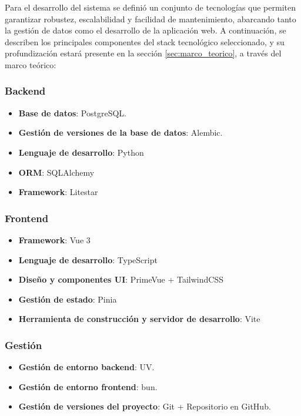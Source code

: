 Para el desarrollo del sistema se definió un conjunto de tecnologías que permiten garantizar 
robustez, escalabilidad y facilidad de mantenimiento, abarcando tanto la gestión de datos 
como el desarrollo de la aplicación web. A continuación, se describen los principales 
componentes del stack tecnológico seleccionado, y su profundización estará presente en la 
sección \ref{sec:marco_teorico}, a través del marco teórico:

\subsubsection*{Backend}

\begin{itemize}
	\item \textbf{Base de datos}: PostgreSQL.
	\item \textbf{Gestión de versiones de la base de datos}: Alembic.
	\item \textbf{Lenguaje de desarrollo}: Python
	\item \textbf{ORM}: SQLAlchemy
	\item \textbf{Framework}: Litestar
\end{itemize}

\subsubsection*{Frontend}

\begin{itemize}
	\item \textbf{Framework}: Vue 3
	\item \textbf{Lenguaje de desarrollo}: TypeScript
	\item \textbf{Diseño y componentes UI}: PrimeVue + TailwindCSS
	\item \textbf{Gestión de estado}: Pinia
	\item \textbf{Herramienta de construcción y servidor de desarrollo}: Vite
\end{itemize}

\subsubsection*{Gestión}

\begin{itemize}
	\item \textbf{Gestión de entorno backend}: UV.
	\item \textbf{Gestión de entorno frontend}: bun.
	\item \textbf{Gestión de versiones del proyecto}: Git + Repositorio en GitHub.
\end{itemize}

